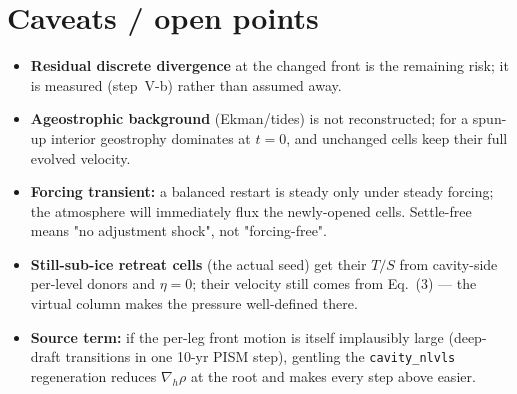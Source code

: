 \documentclass[11pt,a4paper]{article}
\newcommand{\code}[1]{\texttt{#1}}
\begin{document}
\section{Caveats / open points}
\begin{itemize}[leftmargin=1.5em,itemsep=1pt]
  \item \textbf{Residual discrete divergence} at the changed front is the remaining risk; it is
        measured (step~V-b) rather than assumed away.
  \item \textbf{Ageostrophic background} (Ekman/tides) is not reconstructed; for a spun-up interior
        geostrophy dominates at $t{=}0$, and unchanged cells keep their full evolved velocity.
  \item \textbf{Forcing transient:} a balanced restart is steady only under steady forcing; the
        atmosphere will immediately flux the newly-opened cells. Settle-free means "no
        adjustment shock", not "forcing-free".
  \item \textbf{Still-sub-ice retreat cells} (the actual seed) get their $T/S$ from cavity-side
        per-level donors and $\eta=0$; their velocity still comes from Eq.~(3) --- the virtual
        column makes the pressure well-defined there.
  \item \textbf{Source term:} if the per-leg front motion is itself implausibly large (deep-draft
        transitions in one 10-yr PISM step), gentling the \code{cavity\_nlvls} regeneration
        reduces $\nabla_h\rho$ at the root and makes every step above easier.
\end{itemize}
\end{document}
